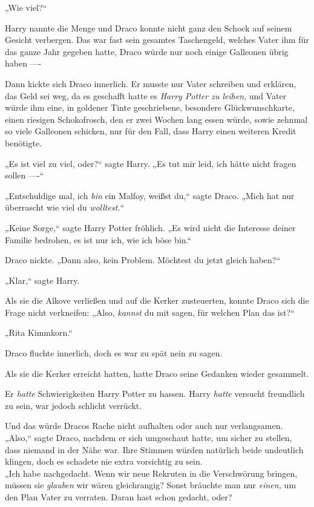 {„Wie viel?“

Harry nannte die Menge und Draco konnte nicht ganz den Schock auf seinem Gesicht verbergen. Das war fast sein gesamtes Taschengeld, welches Vater ihm für das ganze Jahr gegeben hatte, Draco würde nur noch einige Galleonen übrig haben ----

Dann kickte sich Draco innerlich. Er musste nur Vater schreiben und erklären, das Geld sei weg, da es geschafft hatte es \emph{Harry Potter zu leihen}, und Vater würde ihm eine, in goldener Tinte geschriebene, besondere Glückwunschkarte, einen riesigen Schokofrosch, den er zwei Wochen lang essen würde, sowie zehnmal so viele Galleonen schicken, nur für den Fall, dass Harry einen weiteren Kredit benötigte.

„Es ist viel zu viel, oder?“ sagte Harry. „Es tut mir leid, ich hätte nicht fragen sollen ----“

„Entschuldige mal, ich \emph{bin} ein Malfoy, weißst du,“ sagte Draco. „Mich hat nur überrascht wie viel du \emph{wolltest.“}

\emph{„}Keine Sorge,“ sagte Harry Potter fröhlich. „Es wird nicht die Interesse deiner Familie bedrohen, es ist nur ich, wie ich böse bin.“

Draco nickte. „Dann also, kein Problem. Möchtest du jetzt gleich haben?“

„Klar,“ sagte Harry.

Als sie die Alkove verließen und auf die Kerker zusteuerten, konnte Draco sich die Frage nicht verkneifen: „Also, \emph{kannst} du mit sagen, für welchen Plan das ist?“

„Rita Kimmkorn.“

Draco fluchte innerlich, doch es war zu spät nein zu sagen.

Als sie die Kerker erreicht hatten, hatte Draco seine Gedanken wieder gesammelt.

Er \emph{hatte} Schwierigkeiten Harry Potter zu hassen. Harry \emph{hatte} versucht freundlich zu sein, war jedoch schlicht verrückt.

Und das würde Dracos Rache nicht aufhalten oder auch nur verlangsamen. „Also,“ sagte Draco, nachdem er sich umgeschaut hatte, um sicher zu stellen, dass niemand in der Nähe war. Ihre Stimmen würden natürlich beide undeutlich klingen, doch es schadete nie extra vorsichtig zu sein.\\ „Ich habe nachgedacht. Wenn wir neue Rekruten in die Verschwörung bringen, müssen sie \emph{glauben} wir wären gleichrangig? Sonst bräuchte man nur \emph{einen,} um den Plan Vater zu verraten. Daran hast schon gedacht, oder?

}
